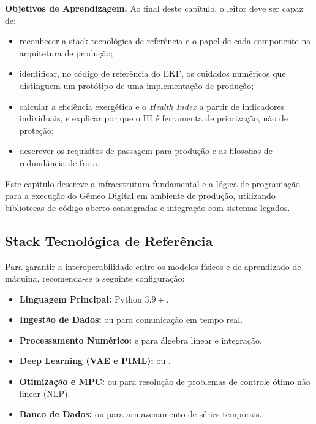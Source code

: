 \documentclass[12pt,a4paper]{article}
\numberwithin{equation}{section}
\numberwithin{table}{section}
\numberwithin{figure}{section}
\begin{document}
{	\textbf{Objetivos de Aprendizagem.} Ao final deste capítulo, o leitor
	deve ser capaz de:
	\begin{itemize}
		\item reconhecer a stack tecnológica de referência e o papel de
		cada componente na arquitetura de produção;
		\item identificar, no código de referência do EKF, os cuidados
		numéricos que distinguem um protótipo de uma implementação de
		produção;
		\item calcular a eficiência exergética e o \textit{Health Index}
		a partir de indicadores individuais, e explicar por que o HI é
		ferramenta de priorização, não de proteção;
		\item descrever os requisitos de passagem para produção e as
		filosofias de redundância de frota.
	\end{itemize}

	Este capítulo descreve a infraestrutura fundamental e a lógica de programação para a execução do Gêmeo Digital em ambiente de produção, utilizando bibliotecas de código aberto consagradas e integração com sistemas legados.
	
	\subsection{Stack Tecnológica de Referência}
	Para garantir a interoperabilidade entre os modelos físicos e de aprendizado de máquina, recomenda-se a seguinte configuração:
	\begin{itemize}
		\item \textbf{Linguagem Principal:} Python $3.9+$.
		\item \textbf{Ingestão de Dados:}  ou  para comunicação em tempo real.
		\item \textbf{Processamento Numérico:}  e  para álgebra linear e integração.
		\item \textbf{Deep Learning (VAE e PIML):}  ou .
		\item \textbf{Otimização e MPC:}  ou  para resolução de problemas de controle ótimo não linear (NLP).
		\item \textbf{Banco de Dados:}  ou  para armazenamento de séries temporais.
	\end{itemize}
	
}
\end{document}
